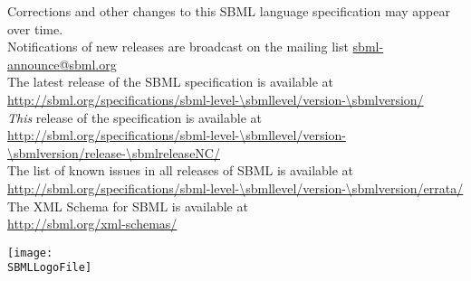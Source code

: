 \vfill

\begin{center}
Corrections and other changes to this SBML language specification may appear over time.\\
Notifications of new releases are broadcast on the mailing list \href{http://www.sbml.org/forums}{sbml-announce@sbml.org}\\[10pt]

The latest release of the SBML \thisLV specification is available at\\
\url{http://sbml.org/specifications/sbml-level-\sbmllevel/version-\sbmlversion/}\\[10pt]

\emph{This} release of the specification is available at\\
\url{http://sbml.org/specifications/sbml-level-\sbmllevel/version-\sbmlversion/release-\sbmlreleaseNC/}\\[10pt]

The list of known issues in all releases of SBML \thisLV is available at\\
\url{http://sbml.org/specifications/sbml-level-\sbmllevel/version-\sbmlversion/errata/}\\[10pt]

The XML Schema for SBML \thisLV is available at\\
\url{http://sbml.org/xml-schemas/}\\[10pt]
\end{center}

\vfill

\centerline{\texttt{[image: \\SBMLLogoFile]}}
